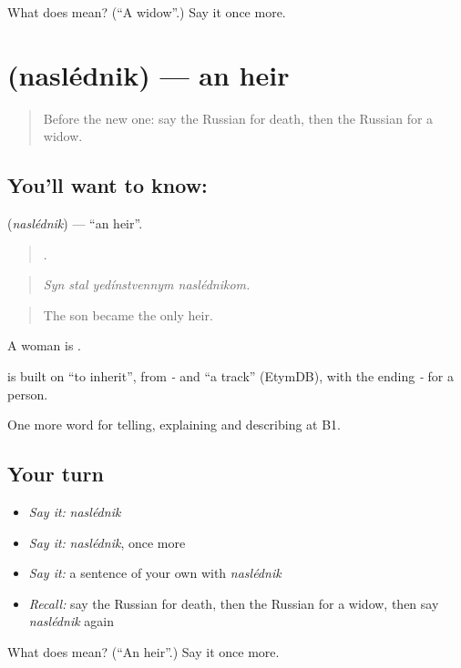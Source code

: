 \begin{tcolorbox}[breakable,colback=teal!4,colframe=teal!35!black,title={Before you move on}]
What does  mean? (\textquotedblleft{}A widow\textquotedblright{}.) Say it once more.
\end{tcolorbox}
\section[\texorpdfstring{\ru{наследник} (naslédnik)}{наследник (naslédnik)}]{ (naslédnik) — an heir}

\label{lesson:RU-C309-naslednik}



\begin{quote}
Before the new one: say the Russian for death, then the Russian for a widow.
\end{quote}

\subsection*{You'll want to know: }
\textbf{} (\emph{naslédnik}) — \textquotedblleft{}an heir\textquotedblright{}.

\begin{quote}
   .
\end{quote}

\begin{quote}
\emph{Syn stal yedínstvennym naslédnikom.}
\end{quote}

\begin{quote}
The son became the only heir.
\end{quote}

A woman is \emph{}.

\begin{cousinweb}
\emph{} is built on \emph{} \textquotedblleft{}to inherit\textquotedblright{}, from \emph{-} and \emph{} \textquotedblleft{}a track\textquotedblright{} (EtymDB), with the ending \emph{-} for a person.
\end{cousinweb}

\begin{grammarlens}[title={What you've built}]
One more word for telling, explaining and describing at B1.
\end{grammarlens}

\subsection*{Your turn}
\begin{itemize}
\raggedright
  \item \emph{Say it:} \emph{naslédnik}
  \item \emph{Say it:} \emph{naslédnik}, once more
  \item \emph{Say it:} a sentence of your own with \emph{naslédnik}
  \item \emph{Recall:} say the Russian for death, then the Russian for a widow, then say \emph{naslédnik} again
\end{itemize}

\begin{tcolorbox}[breakable,colback=teal!4,colframe=teal!35!black,title={Before you move on}]
What does  mean? (\textquotedblleft{}An heir\textquotedblright{}.) Say it once more.
\end{tcolorbox}
